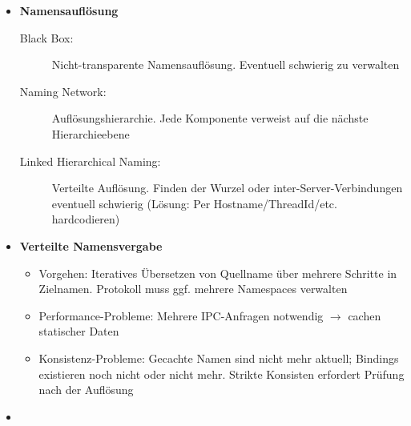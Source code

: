 \begin{itemize}
	\item \textbf{Namensauflösung}
	\begin{description}
		\item[Black Box:] Nicht-transparente Namensauflösung. Eventuell schwierig zu verwalten
		\item[Naming Network:] Auflösungshierarchie. Jede Komponente verweist auf die nächste Hierarchieebene
		\item[Linked Hierarchical Naming:] Verteilte Auflösung. Finden der Wurzel oder inter-Server-Verbindungen eventuell schwierig (Lösung: Per Hostname/ThreadId/etc. hardcodieren)
	\end{description}
	\item \textbf{Verteilte Namensvergabe}
	\begin{itemize}
		\item Vorgehen: Iteratives Übersetzen von Quellname über mehrere Schritte in Zielnamen. Protokoll muss ggf. mehrere Namespaces verwalten
		\item Performance-Probleme: Mehrere IPC-Anfragen notwendig \(\rightarrow\) cachen statischer Daten
		\item Konsistenz-Probleme: Gecachte Namen sind nicht mehr aktuell; Bindings existieren noch nicht oder nicht mehr. Strikte Konsisten erfordert Prüfung nach der Auflösung
	\end{itemize}
	\item %
\end{itemize}



















